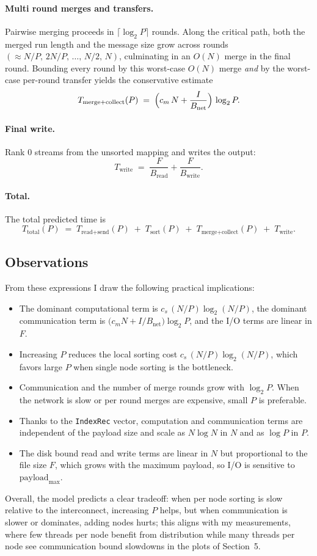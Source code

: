 \documentclass[12pt]{article}
\begin{document}
\paragraph{Multi round merges and transfers.}
Pairwise merging proceeds in \(\lceil\log_2 P\rceil\) rounds. Along the critical path, both the merged run length and the message size grow across rounds \((\approx N/P,\, 2N/P,\, \ldots,\, N/2,\, N)\), culminating in an \(O(N)\) merge in the final round. Bounding every round by this worst-case \(O(N)\) merge \emph{and} by the worst-case per-round transfer yields the conservative estimate
\[
T_{\text{merge+collect}}(P)
\;=\;
\Bigl(c_m\,N + \frac{I}{B_{\text{net}}}\Bigr)\,\log_2 P.
\]

\paragraph{Final write.}
Rank 0 streams from the unsorted mapping and writes the output:
\[
T_{\text{write}}
\;=\;
\frac{F}{B_{\text{read}}} + \frac{F}{B_{\text{write}}}.
\]

\paragraph{Total.}
The total predicted time is
\[
T_{\text{total}}(P)
\;=\;
T_{\text{read+send}}(P)
\;+\;
T_{\text{sort}}(P)
\;+\;
T_{\text{merge+collect}}(P)
\;+\;
T_{\text{write}}.
\]

\subsection{Observations}
From these expressions I draw the following practical implications:
\begin{itemize}
  \item The dominant computational term is \(c_s\,(N/P)\log_2(N/P)\), the dominant communication term is \(\bigl(c_m N + I/B_{\text{net}}\bigr)\log_2 P\), and the I/O terms are linear in \(F\).
  \item Increasing \(P\) reduces the local sorting cost \(c_s\,(N/P)\log_2(N/P)\), which favors large \(P\) when single node sorting is the bottleneck.
  \item Communication and the number of merge rounds grow with \(\log_2 P\). When the network is slow or per round merges are expensive, small \(P\) is preferable.
  \item Thanks to the \texttt{IndexRec} vector, computation and communication terms are independent of the payload size and scale as \(N\log N\) in \(N\) and as \(\log P\) in \(P\).
  \item The disk bound read and write terms are linear in \(N\) but proportional to the file size \(F\), which grows with the maximum payload, so I/O is sensitive to \(\text{payload}_{\max}\).
\end{itemize}

Overall, the model predicts a clear tradeoff: when per node sorting is slow relative to the interconnect, increasing \(P\) helps, but when communication is slower or dominates, adding nodes hurts; this aligns with my measurements, where few threads per node benefit from distribution while many threads per node see communication bound slowdowns in the plots of Section~5.
\end{document}
